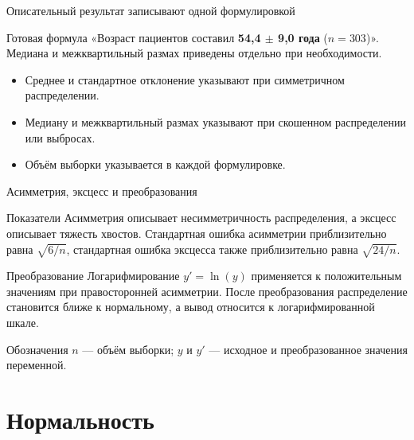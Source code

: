 \documentclass[aspectratio=169]{beamer}
\begin{document}
\begin{frame}{Описательный результат записывают одной формулировкой}
  \begin{block}{Готовая формула}
    «Возраст пациентов составил \textbf{54,4 $\pm$ 9,0 года} ($n = 303$)». Медиана и межквартильный размах приведены отдельно при необходимости.
  \end{block}
  \begin{itemize}
    \item Среднее и стандартное отклонение указывают при симметричном распределении.
    \item Медиану и межквартильный размах указывают при скошенном распределении или выбросах.
    \item Объём выборки указывается в каждой формулировке.
  \end{itemize}
\end{frame}

\begin{frame}{Асимметрия, эксцесс и преобразования}
  \begin{block}{Показатели}\footnotesize
    Асимметрия описывает несимметричность распределения, а эксцесс описывает тяжесть хвостов. Стандартная ошибка асимметрии приблизительно равна $\sqrt{6/n}$, стандартная ошибка эксцесса также приблизительно равна $\sqrt{24/n}$.
  \end{block}
  \begin{block}{Преобразование}\footnotesize
    Логарифмирование $y'=\ln(y)$ применяется к положительным значениям при правосторонней асимметрии. После преобразования распределение становится ближе к нормальному, а вывод относится к логарифмированной шкале.
  \end{block}
  \begin{block}{Обозначения}\tiny
    $n$ — объём выборки; $y$ и $y'$ — исходное и преобразованное значения переменной.
  \end{block}
\end{frame}

\section{Нормальность}
\end{document}
